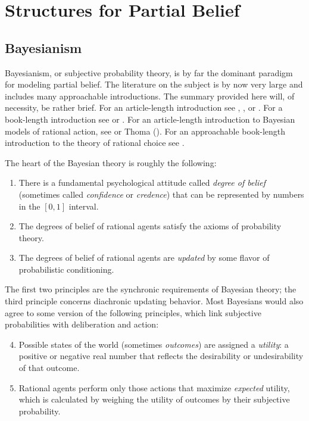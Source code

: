   
\section{Structures for Partial Belief}
\subsection{Bayesianism}

Bayesianism, or subjective probability theory, is by far the dominant paradigm
for modeling partial belief. The literature on the subject is by now very large
and includes many approachable introductions. The summary provided here will, of
necessity, be rather brief. For an article-length introduction see
\citet{sep-formal-belief}, \citet{easwaran2011bayesA,easwaran2011bayesB}, or
\citet{weisberg2011varieties}. For a book-length introduction see
\citet{earman1992bayes} or \citet{howson2006scientific}. For an article-length
introduction to Bayesian models of rational action, see
\citet{sep-rationality-normative-utility} or Thoma (). 
For an approachable book-length introduction to the theory of rational choice see 
\citet{resnik1987choices}. 

The heart of the Bayesian theory is roughly the following:
\begin{enumerate}
  \item There is a fundamental psychological attitude called {\em degree of
  belief} (sometimes called {\em confidence} or {\em credence}) that can be
  represented by numbers in the $[0,1]$ interval.
  \item The degrees of belief of rational agents satisfy the axioms of
  probability theory.
  \item The degrees of belief of rational agents are {\em updated} by some
  flavor of probabilistic conditioning.
\end{enumerate}
The first two principles are the synchronic requirements of Bayesian theory; the
third principle concerns diachronic updating behavior. Most Bayesians would also
agree to some version of the following principles, which link subjective
probabilities with deliberation and action:
\begin{enumerate}\setcounter{enumi}{3}
  \item Possible states of the world (sometimes {\em outcomes}) are assigned a
  {\em utility}: a positive or negative real number that reflects the
  desirability or undesirability of that outcome.
  \item Rational agents perform only those actions that maximize {\em expected}
  utility, which is calculated by weighing the utility of outcomes by their
  subjective probability.
\end{enumerate}

